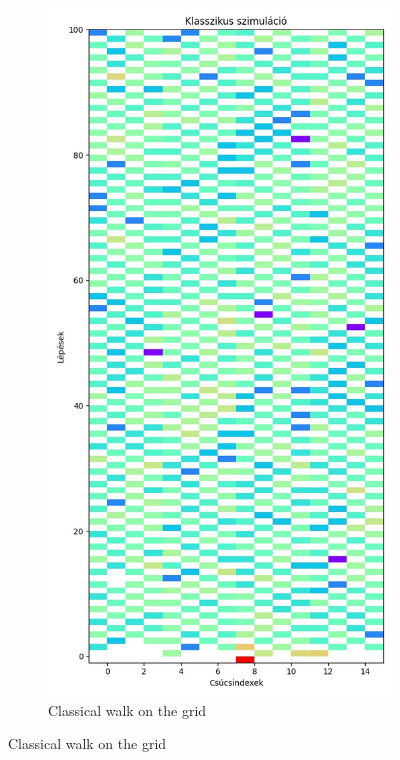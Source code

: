 \begin{figure}[H]
  \centering
  \begin{subfigure}{.45\linewidth}
    \centering
    \includegraphics[width=\linewidth]{./figures/results/grid/classical.jpg}
    \caption{Classical walk on the grid}

\end{subfigure}
\end{figure}
